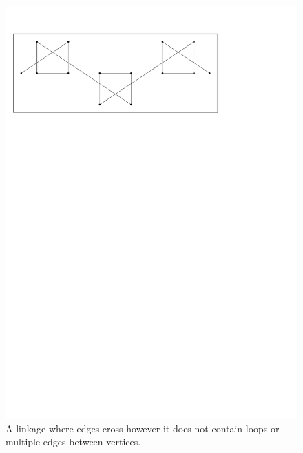 \begin{figure}[h]
\begin{center}
\includegraphics[scale=1]{graphics/crossingEdgeLinkage.pdf}
\end{center} 
\caption{A linkage where edges cross however it does not contain loops or multiple edges between 
vertices.}
\label{fig:linkage-3}
\end{figure}